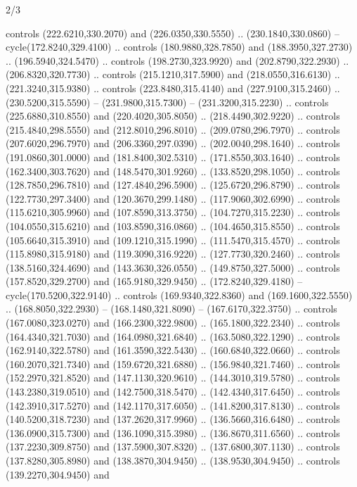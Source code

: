 \begin{flagdescription}{2/3}
\begin{scope}[xshift=0.5\flaglength,yshift=0.5\flagwidth,scale=\stretchfactor]
\begin{scope}[scale=0.001645\flagwidth,yshift=65mm,xshift=-63mm]
\begin{scope}[y=0.80pt, x=0.80pt, yscale=-1,]
\begin{scope}[cm={{1.33333,0.0,0.0,1.33333,(0.0,1e-05)}}]
  controls (222.6210,330.2070) and (226.0350,330.5550) .. (230.1840,330.0860) --
  cycle(172.8240,329.4100) .. controls (180.9880,328.7850) and
  (188.3950,327.2730) .. (196.5940,324.5470) .. controls (198.2730,323.9920) and
  (202.8790,322.2930) .. (206.8320,320.7730) .. controls (215.1210,317.5900) and
  (218.0550,316.6130) .. (221.3240,315.9380) .. controls (223.8480,315.4140) and
  (227.9100,315.2460) .. (230.5200,315.5590) -- (231.9800,315.7300) --
  (231.3200,315.2230) .. controls (225.6880,310.8550) and (220.4020,305.8050) ..
  (218.4490,302.9220) .. controls (215.4840,298.5550) and (212.8010,296.8010) ..
  (209.0780,296.7970) .. controls (207.6020,296.7970) and (206.3360,297.0390) ..
  (202.0040,298.1640) .. controls (191.0860,301.0000) and (181.8400,302.5310) ..
  (171.8550,303.1640) .. controls (162.3400,303.7620) and (148.5470,301.9260) ..
  (133.8520,298.1050) .. controls (128.7850,296.7810) and (127.4840,296.5900) ..
  (125.6720,296.8790) .. controls (122.7730,297.3400) and (120.3670,299.1480) ..
  (117.9060,302.6990) .. controls (115.6210,305.9960) and (107.8590,313.3750) ..
  (104.7270,315.2230) .. controls (104.0550,315.6210) and (103.8590,316.0860) ..
  (104.4650,315.8550) .. controls (105.6640,315.3910) and (109.1210,315.1990) ..
  (111.5470,315.4570) .. controls (115.8980,315.9180) and (119.3090,316.9220) ..
  (127.7730,320.2460) .. controls (138.5160,324.4690) and (143.3630,326.0550) ..
  (149.8750,327.5000) .. controls (157.8520,329.2700) and (165.9180,329.9450) ..
  (172.8240,329.4180) -- cycle(170.5200,322.9140) .. controls
  (169.9340,322.8360) and (169.1600,322.5550) .. (168.8050,322.2930) --
  (168.1480,321.8090) -- (167.6170,322.3750) .. controls (167.0080,323.0270) and
  (166.2300,322.9800) .. (165.1800,322.2340) .. controls (164.4340,321.7030) and
  (164.0980,321.6840) .. (163.5080,322.1290) .. controls (162.9140,322.5780) and
  (161.3590,322.5430) .. (160.6840,322.0660) .. controls (160.2070,321.7340) and
  (159.6720,321.6880) .. (156.9840,321.7460) .. controls (152.2970,321.8520) and
  (147.1130,320.9610) .. (144.3010,319.5780) .. controls (143.2380,319.0510) and
  (142.7500,318.5470) .. (142.4340,317.6450) .. controls (142.3910,317.5270) and
  (142.1170,317.6050) .. (141.8200,317.8130) .. controls (140.5200,318.7230) and
  (137.2620,317.9960) .. (136.5660,316.6480) .. controls (136.0900,315.7300) and
  (136.1090,315.3980) .. (136.8670,311.6560) .. controls (137.2230,309.8750) and
  (137.5900,307.8320) .. (137.6800,307.1130) .. controls (137.8280,305.8980) and
  (138.3870,304.9450) .. (138.9530,304.9450) .. controls (139.2270,304.9450) and

\end{scope}
\end{scope}
\end{scope}
\end{scope}
\end{flagdescription}
